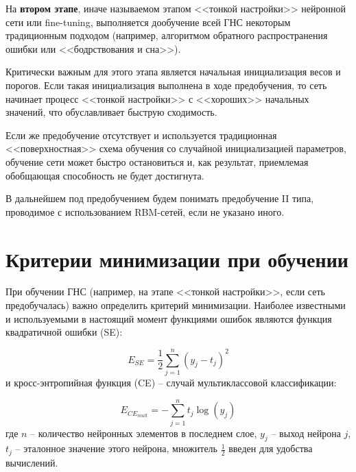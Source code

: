 	

На \textbf{втором этапе}, иначе называемом этапом <<тонкой настройки>> нейронной сети или fine-tuning, выполняется дообучение всей ГНС некоторым традиционным подходом (например, алгоритмом обратного распространения ошибки или <<бодрствования и сна>>).

Критически важным для этого этапа является начальная инициализация весов и порогов. Если такая инициализация выполнена в ходе предобучения, то сеть начинает процесс <<тонкой настройки>> с <<хороших>> начальных значений, что обуславливает быструю сходимость.

Если же предобучение отсутствует и используется традиционная <<поверхностная>> схема обучения со случайной инициализацией параметров, обучение сети может быстро остановиться и, как результат, приемлемая обобщающая способность не будет достигнута.

В дальнейшем под предобучением будем понимать предобучение II типа, проводимое с использованием RBM-сетей, если не указано иного. 

\section{Критерии минимизации при обучении}

При обучении ГНС (например, на этапе <<тонкой настройки>>, если сеть предобучалась) важно определить критерий минимизации. Наиболее известными и используемыми в настоящий момент функциями ошибок являются функция квадратичной ошибки (SE):

\begin{equation}
	\label{MSE}
	E_{SE} = \frac{1}{2}\sum_{j=1}^{n}(y_j - t_j)^2
\end{equation}
и кросс-энтропийная функция (CE) -- случай мультиклассовой классификации:

\begin{equation}
	\label{CE_multiclass}
	E_{CE_{mult}} = -\sum_{j=1}^{n}t_j\log(y_j)
\end{equation}
где $n$ -- количество нейронных элементов в последнем слое, $y_j$ -- выход нейрона $j$, $t_j$ -- эталонное значение этого нейрона, множитель $\frac{1}{2}$ введен для удобства вычислений.

